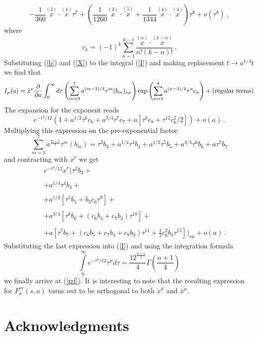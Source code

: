 \documentclass[a4paper,12pt]{article}
\begin{document}
$$
-\frac 1{360} \stackrel{(3)}{x}\cdot
\stackrel{(4)}{x}\tau^7+\left(\frac 1{1260}\stackrel{(3)}{x}\cdot
\stackrel{(5)}{x} +\frac 1{1344}\stackrel{(4)}{x}\cdot
\stackrel{(4)}{x}\right)\tau^8+o(\tau^8)\,,
$$
$$ $$
where
$$
c_k=(-1)^k\sum_{n=1}^{k-1}\frac{\stackrel{(n)}{x}\cdot
\stackrel{(k-n)}{x}}{n!(k-n)!}\,.
$$
Substituting (\ref{b}) and (\ref{X}) to the integral (\ref{I}) and
making replacement $t\rightarrow a^{1/4}t$ we find that
\begin{equation}
I_\mu (a)=\dot x^\nu \frac{\partial}{\partial a}\int_0^{\infty}
d\tau\left(\sum_{m=3}^7a^{(m-3)/4}\tau^m
(b_m)_{\nu\mu}\right)\exp\left(
\sum_{n=4}^8a^{(n-4)/4}\tau^nc_n\right)+ {\rm (regular\;terms)}
\end{equation}
The expansion for the exponent reads
\begin{equation}
e^{-\tau^4/12}(1+a^{1/2}\tau^6c_6+a^{3/4}\tau^7c_7+a[\tau^8c_8+\tau^{12}c_6^2/2])+o(a)\,.
\end{equation}
Multiplying this expression on the pre-exponential factor
$$
\sum_{m=3}^7a^{\frac{m-3} 4}\tau^m
(b_m)=\tau^3b_3+a^{1/4}\tau^4b_4+a^{1/2}
\tau^5b_5+a^{3/4}\tau^6b_6+a\tau^7b_7
$$
and contracting with $\dot x^\nu$ we get
\begin{equation}
\begin{array}{lll}
&&e^{-\tau^4/12}\dot{x}^\nu(\tau^3b_3+  \\
&&  \\
&&+a^{1/4}\tau^4b_4+  \\
&&  \\
&&+a^{1/2}[\tau^5b_5+b_3c_6\tau^9]+ \\
&& \\
&&+a^{3/4}[\tau^6b_6+(c_6b_4+c_7b_3)\tau^{10}]+   \\
&&  \nonumber \\
&&+a[\tau^7b_7+(c_6b_5+c_7b_4+c_8b_3)\tau^{11}+\frac
12c_6^2b_3\tau^{15}])_{\nu\mu}+o(a)\,.
\end{array}
\end{equation}
Substituting the last expression into (\ref{I}) and using the
integration formula
\begin{equation}
\int\limits_0^{\infty}e^{-\tau^4/12}\tau^n
d\tau=\frac{12^{\frac{n+1}4}}{4}\Gamma \left( \frac{n+1}4\right)
\end{equation}
we finally arrive at (\ref{rrf}). It is interesting to note that
the resulting expression for $F^{rr}_\mu(s,a)$ turns out to be
orthogonal to both $\dot x^\mu$ and $\ddot x^\mu$.

\section*{Acknowledgments}
\end{document}
